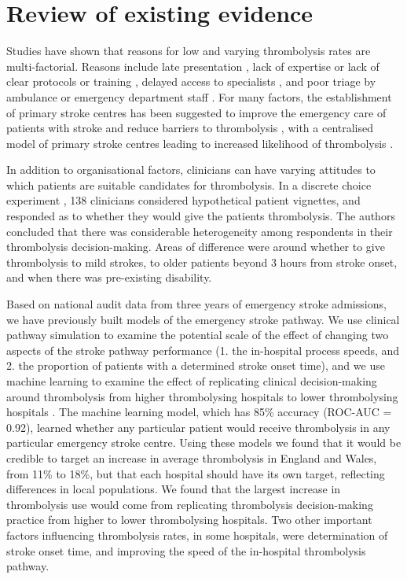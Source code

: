 \section{Review of existing evidence}




Studies have shown that reasons for low and varying thrombolysis rates are multi-factorial. Reasons include late presentation \cite{aguiar_de_sousa_access_2019}, lack of expertise \cite{aguiar_de_sousa_access_2019} or lack of clear protocols or training \cite{carter-jones_stroke_2011}, delayed access to specialists \cite{kamal_delays_2017}, and poor triage by ambulance or emergency department staff \cite{carter-jones_stroke_2011}. For many factors, the establishment of primary stroke centres has been suggested to improve the emergency care of patients with stroke and reduce barriers to thrombolysis \cite{carter-jones_stroke_2011}, with a centralised model of primary stroke centres leading to increased likelihood of thrombolysis \cite{lahr_proportion_2012, morris_impact_2014, hunter_impact_2013}. 

In addition to organisational factors, clinicians can have varying attitudes to which patients are suitable candidates for thrombolysis. In a discrete choice experiment \cite{de_brun_factors_2018}, 138 clinicians considered hypothetical patient vignettes, and responded as to whether they would give the patients thrombolysis. The authors concluded that there was considerable heterogeneity among respondents in their thrombolysis decision-making. Areas of difference were around whether to give thrombolysis to mild strokes, to older patients beyond 3 hours from stroke onset, and when there was pre-existing disability.

Based on national audit data from three years of emergency stroke admissions, we have previously built models of the emergency stroke pathway. We use clinical pathway simulation to examine the potential scale of the effect of changing two aspects of the stroke pathway performance (1. the in-hospital process speeds, and 2. the proportion of patients with a determined stroke onset time), and we use machine learning to examine the effect of replicating clinical decision-making around thrombolysis from higher thrombolysing hospitals to lower thrombolysing hospitals \cite{allen_using_2022, allen_use_2022}. The machine learning model, which has 85\% accuracy (ROC-AUC = 0.92), learned whether any particular patient would receive thrombolysis in any particular emergency stroke centre. Using these models we found that it would be credible to target an increase in average thrombolysis in England and Wales, from 11\% to 18\%, but that each hospital should have its own target, reflecting differences in local populations. We found that the largest increase in thrombolysis use would come from replicating thrombolysis decision-making practice from higher to lower thrombolysing hospitals. Two other important factors influencing thrombolysis rates, in some hospitals, were determination of stroke onset time, and improving the speed of the in-hospital thrombolysis pathway.

